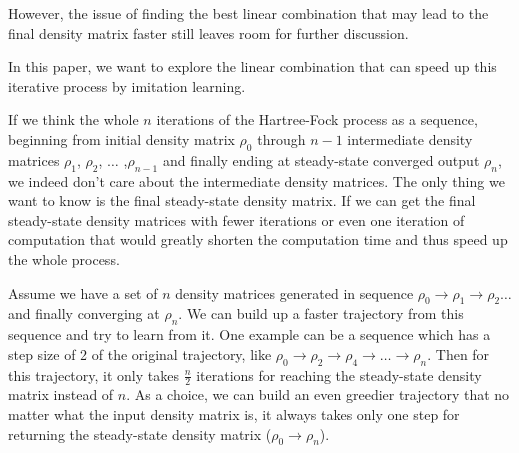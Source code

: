 \documentclass[twoside,11pt]{article}
\begin{document}
However, the issue of finding the best linear combination that may lead to the final density matrix faster still leaves room for further discussion.

In this paper,
we want to explore the linear combination that can speed up this iterative process by imitation learning. 






If we think the whole $n$ iterations of the Hartree-Fock process as a sequence, beginning from initial density matrix $\rho_0$ through $n-1$ intermediate density matrices $\rho_1$,  $\rho_2$,  $\ldots$ ,$\rho_{n-1}$ and finally ending at steady-state converged output $\rho_{n}$, we indeed don't care about the intermediate density matrices. The only thing we want to know is the final steady-state density matrix. If we can get the final steady-state density matrices with fewer iterations or even one iteration of computation that would greatly shorten the computation time and thus speed up the whole process. 



Assume we have a set of $n$ density matrices generated in sequence   $\rho_0 \rightarrow  \rho_1 \rightarrow  \rho_2  \ldots  $ and finally converging at $\rho_{n}$. 
We can build up a faster trajectory from this sequence and try to learn from it.
One example can be a sequence which has a step size of 2 of the original trajectory, like $\rho_0 \rightarrow \rho_2 \rightarrow  \rho_4 \rightarrow  \ldots \rightarrow  \rho_{n}$. Then for this trajectory, it only takes $\frac{n}{2}$ iterations for reaching the steady-state density matrix instead of $n$.
As a choice, we can build an even greedier trajectory that no matter what the input density matrix is, it always takes only one step for returning the steady-state density matrix ($\rho_0 \rightarrow \rho_{n}$).
\end{document}
